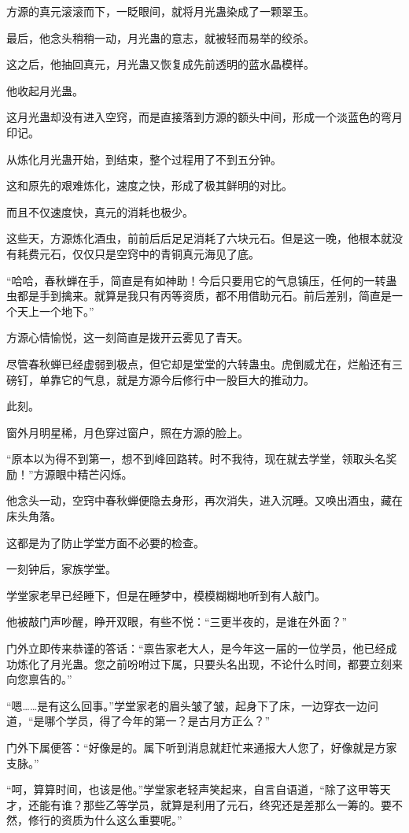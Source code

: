 \begin{this_body}
方源的真元滚滚而下，一眨眼间，就将月光蛊染成了一颗翠玉。

最后，他念头稍稍一动，月光蛊的意志，就被轻而易举的绞杀。

这之后，他抽回真元，月光蛊又恢复成先前透明的蓝水晶模样。

他收起月光蛊。

这月光蛊却没有进入空窍，而是直接落到方源的额头中间，形成一个淡蓝色的弯月印记。

从炼化月光蛊开始，到结束，整个过程用了不到五分钟。

这和原先的艰难炼化，速度之快，形成了极其鲜明的对比。

而且不仅速度快，真元的消耗也极少。

这些天，方源炼化酒虫，前前后后足足消耗了六块元石。但是这一晚，他根本就没有耗费元石，仅仅只是空窍中的青铜真元海见了底。

“哈哈，春秋蝉在手，简直是有如神助！今后只要用它的气息镇压，任何的一转蛊虫都是手到擒来。就算是我只有丙等资质，都不用借助元石。前后差别，简直是一个天上一个地下。”

方源心情愉悦，这一刻简直是拨开云雾见了青天。

尽管春秋蝉已经虚弱到极点，但它却是堂堂的六转蛊虫。虎倒威尤在，烂船还有三磅钉，单靠它的气息，就是方源今后修行中一股巨大的推动力。

此刻。

窗外月明星稀，月色穿过窗户，照在方源的脸上。

“原本以为得不到第一，想不到峰回路转。时不我待，现在就去学堂，领取头名奖励！”方源眼中精芒闪烁。

他念头一动，空窍中春秋蝉便隐去身形，再次消失，进入沉睡。又唤出酒虫，藏在床头角落。

这都是为了防止学堂方面不必要的检查。

一刻钟后，家族学堂。

学堂家老早已经睡下，但是在睡梦中，模模糊糊地听到有人敲门。

他被敲门声吵醒，睁开双眼，有些不悦：“三更半夜的，是谁在外面？”

门外立即传来恭谨的答话：“禀告家老大人，是今年这一届的一位学员，他已经成功炼化了月光蛊。您之前吩咐过下属，只要头名出现，不论什么时间，都要立刻来向您禀告的。”

“嗯……是有这么回事。”学堂家老的眉头皱了皱，起身下了床，一边穿衣一边问道，“是哪个学员，得了今年的第一？是古月方正么？”

门外下属便答：“好像是的。属下听到消息就赶忙来通报大人您了，好像就是方家支脉。”

“呵，算算时间，也该是他。”学堂家老轻声笑起来，自言自语道，“除了这甲等天才，还能有谁？那些乙等学员，就算是利用了元石，终究还是差那么一筹的。要不然，修行的资质为什么这么重要呢。”


\end{this_body}
